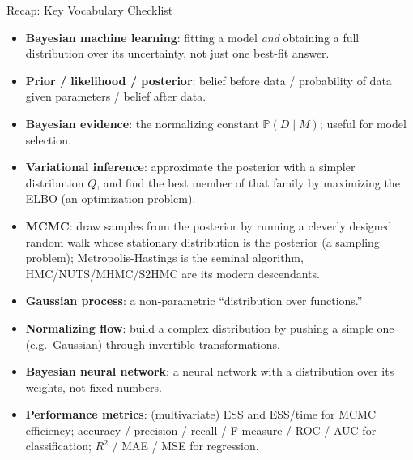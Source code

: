 \documentclass[aspectratio=169,10pt]{beamer}
\begin{document}
\begin{frame}[allowframebreaks]{Recap: Key Vocabulary Checklist}
  \small
  \begin{itemize}
    \item \textbf{Bayesian machine learning}: fitting a model \emph{and}
      obtaining a full distribution over its uncertainty, not just one
      best-fit answer.
    \item \textbf{Prior / likelihood / posterior}: belief before data /
      probability of data given parameters / belief after data.
    \item \textbf{Bayesian evidence}: the normalizing constant
      $\mathbb{P}(D\mid M)$; useful for model selection.
    \item \textbf{Variational inference}: approximate the posterior with a
      simpler distribution $Q$, and find the best member of that family by
      maximizing the ELBO (an optimization problem).
    \item \textbf{MCMC}: draw samples from the posterior by running a
      cleverly designed random walk whose stationary distribution is the
      posterior (a sampling problem); Metropolis-Hastings is the seminal
      algorithm, HMC/NUTS/MHMC/S2HMC are its modern descendants.
    \item \textbf{Gaussian process}: a non-parametric ``distribution over
      functions.''
    \item \textbf{Normalizing flow}: build a complex distribution by pushing
      a simple one (e.g.\ Gaussian) through invertible transformations.
    \item \textbf{Bayesian neural network}: a neural network with a
      distribution over its weights, not fixed numbers.
    \item \textbf{Performance metrics}: (multivariate) ESS and ESS/time for
      MCMC efficiency; accuracy / precision / recall / F-measure / ROC /
      AUC for classification; $R^2$ / MAE / MSE for regression.
  \end{itemize}
\end{frame}
\end{document}
